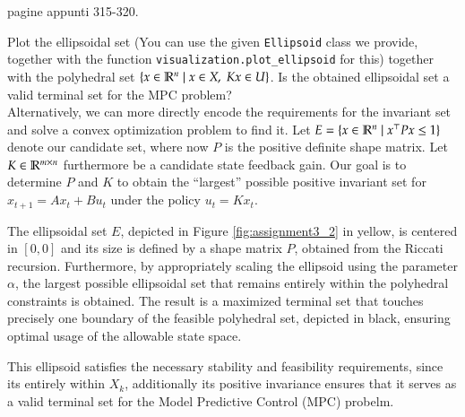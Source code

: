 \documentclass[]{article}
\begin{document}
\begin{flushleft}
	pagine appunti 315-320.
\end{flushleft}



\begin{assignment}
	Plot the ellipsoidal set 
	(You can use the given \texttt{Ellipsoid} class we provide,
	together with the function \texttt{visualization.plot\_ellipsoid} for this)
	together with the polyhedral set $\{ x \in \mathbb{R}^n \mid x \in X,\; Kx \in U \}$.
	Is the obtained ellipsoidal set a valid terminal set for the MPC problem? \\

	Alternatively, we can more directly encode the requirements for the invariant set and solve a convex optimization problem 
	to find it. 
	Let $E = \{ x \in \mathbb{R}^n \mid x^\top P x \leq 1 \}$ denote our candidate set, where 
	now $P$ is the positive definite shape matrix. 
	Let $K \in \mathbb{R}^{m \times n}$ furthermore be a candidate state feedback gain.
	Our goal is to determine 
	$P$ and $K$ to obtain the ``largest'' possible positive invariant set for 
	$x_{t+1} = A x_t + B u_t$ under the policy $u_t = K x_t$.
\end{assignment}
\begin{flushleft}
	The ellipsoidal set $E$, depicted in Figure \ref{fig:assignment3_2} in yellow, is centered in $[0,0]$ and its size is defined by a shape matrix $P$, obtained from the Riccati recursion.
	Furthermore, by appropriately scaling the ellipsoid using the parameter $\alpha$, the largest possible ellipsoidal set that remains entirely within the polyhedral constraints is obtained. 
	The result is a maximized terminal set that touches precisely one boundary of the feasible polyhedral set, depicted in black, ensuring optimal usage of the allowable state space.
	
	This ellipsoid satisfies the necessary stability and feasibility requirements, since its entirely within $X_k$, additionally its positive invariance ensures 
	that it serves as a valid terminal set for the Model Predictive Control (MPC) probelm. 
\end{flushleft}
\end{document}
